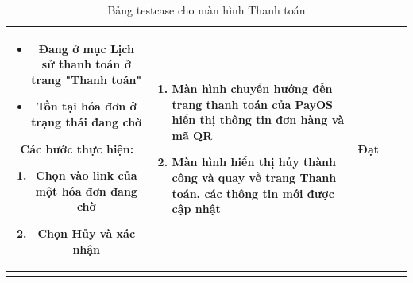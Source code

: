\begin{longtable}{|c|m{2.5cm}|m{5.5cm}|m{4.5cm}|c|}
\begin{itemize}
        \item Đang ở mục Lịch sử thanh toán ở trang "Thanh toán"
        \item Tồn tại hóa đơn ở trạng thái đang chờ
    \end{itemize}
    Các bước thực hiện: 
    \begin{enumerate}[label=\arabic*.]
        \item Chọn vào link của một hóa đơn đang chờ
        \item Chọn Hủy và xác nhận
    \end{enumerate}
    & 
    \begin{enumerate}[label=\arabic*.]
        \item Màn hình chuyển hướng đến trang thanh toán của PayOS hiển thị thông tin đơn hàng và mã QR
        \item Màn hình hiển thị hủy thành công và quay về trang Thanh toán, các thông tin mới được cập nhật
    \end{enumerate} & Đạt \\
    \hline
    \caption{Bảng testcase cho màn hình Thanh toán}
\end{longtable}